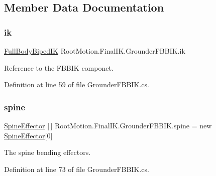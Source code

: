 \subsection{Member Data Documentation}
\mbox{\label{class_root_motion_1_1_final_i_k_1_1_grounder_f_b_b_i_k_ab9415f36a52d8c0fc07c159e29b51a5b}} 
\subsubsection{\texorpdfstring{ik}{ik}}
{\footnotesize\ttfamily \mbox{\hyperlink{class_root_motion_1_1_final_i_k_1_1_full_body_biped_i_k}{Full\+Body\+Biped\+IK}} Root\+Motion.\+Final\+I\+K.\+Grounder\+F\+B\+B\+I\+K.\+ik}



Reference to the F\+B\+B\+IK componet. 



Definition at line 59 of file Grounder\+F\+B\+B\+I\+K.\+cs.

\mbox{\label{class_root_motion_1_1_final_i_k_1_1_grounder_f_b_b_i_k_a3aa444fddf7a1a86810203fbca06121f}} 
\subsubsection{\texorpdfstring{spine}{spine}}
{\footnotesize\ttfamily \mbox{\hyperlink{class_root_motion_1_1_final_i_k_1_1_grounder_f_b_b_i_k_1_1_spine_effector}{Spine\+Effector}} \mbox{[}$\,$\mbox{]} Root\+Motion.\+Final\+I\+K.\+Grounder\+F\+B\+B\+I\+K.\+spine = new \mbox{\hyperlink{class_root_motion_1_1_final_i_k_1_1_grounder_f_b_b_i_k_1_1_spine_effector}{Spine\+Effector}}\mbox{[}0\mbox{]}}



The spine bending effectors. 



Definition at line 73 of file Grounder\+F\+B\+B\+I\+K.\+cs.

